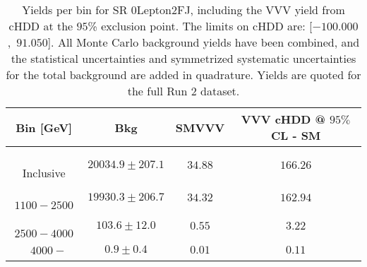 \begin{table}[!htbp]
    \small
    \center
    \begin{tabular}{c||c|c|c}
    Bin [GeV] & Bkg & SMVVV & \pbox{20cm}{VVV \\ cHDD @ $95\%$ CL - SM \\ }\\
    \hline
    \pbox{20cm}{ ~ \\Inclusive\\ } & $20034.9 \pm 207.1$ & $34.88$ & $166.26$\\
    \hline
    \pbox{20cm}{ ~ \\$1100-2500$\\ } & $19930.3 \pm 206.7$ & $34.32$ & $162.94$\\
    \hline
    \pbox{20cm}{ ~ \\$2500-4000$\\ } & $103.6 \pm 12.0$ & $0.55$ & $3.22$\\
    \hline
    \pbox{20cm}{ ~ \\$4000-$\\ } & $0.9 \pm 0.4$ & $0.01$ & $0.11$\\
\end{tabular}
    \caption{Yields per bin for SR 0Lepton2FJ, including the VVV yield from cHDD at the $95$\% exclusion point. The limits on cHDD are: [$-100.000$,~$91.050$]. All Monte Carlo background yields have been combined, and the statistical uncertainties and symmetrized systematic uncertainties for the total background are added in quadrature. Yields are quoted for the full Run 2 dataset.}
    \label{tab:0Lepton2FJ$binssignal}
\end{table}
